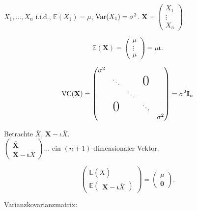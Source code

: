 \documentclass{tstextbook}
\begin{document}
\begin{example}
	\label{example.vc}
	
	$ X_1,\ldots,X_n $ i.i.d., $ \mathbb{E}{(X_1)}= \mu $, $ \operatorname{Var}(X_1) = \sigma^2 $.
	$ \textbf{X} = \begin{pmatrix}
		X_1 \\ \vdots \\ X_n
	\end{pmatrix} $ 

\[	\mathbb{E}(\textbf{X}) = \begin{pmatrix}
		\mu \\ \vdots \\ \mu
	\end{pmatrix} = \mu\boldsymbol{\iota}. 
\]

\[ \VC(\textbf{X}) = \begin{pmatrix}
		
			\sigma^2 										\\
			& \ddots  		& 			& \text{\huge0}		\\
			& 				& \ddots               			\\
			& \text{\huge0} & 			& \ddots           	\\
			& 				& 			& 		& \sigma^2
		
	\end{pmatrix} = \sigma^2 \textbf{I}_n
\]

Betrachte $ \bar{X},\, \textbf{X}-\iota\bar{X} $. \\
$ \begin{pmatrix}
	\bar{\textbf{X}} \\ \textbf{X}-\boldsymbol{\iota}\bar{X}
\end{pmatrix}\ldots $ ein $ (n+1) $-dimensionaler Vektor.


\[
\begin{pmatrix}\mathbb{E}\left(\bar{X}\right)\\
	\mathbb{E}\begin{pmatrix}\textbf{X}-\boldsymbol{\iota}\bar{X}\end{pmatrix}
\end{pmatrix}=\begin{pmatrix}\mu\\
	\boldsymbol{0}
\end{pmatrix}.
\]

Varianzkovarianzmatrix:


\end{example}
\end{document}

